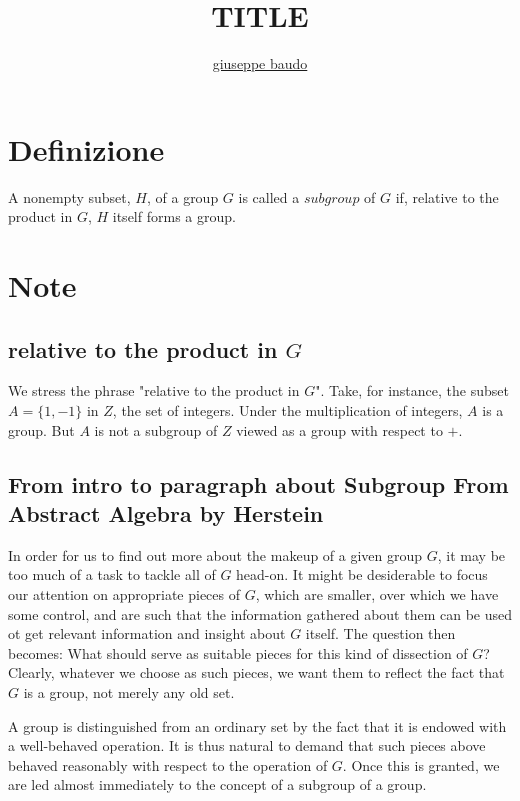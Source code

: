 \documentclass[a4paper,10pt]{article}
\title{TITLE}
\author{\href{http://www.baudo.hol.es}{giuseppe baudo}}
\begin{document}
\maketitle

\section{Definizione}
A nonempty subset, $H$, of a group $G$ is called a $subgroup$ of $G$ if, relative to the product in $G$, $H$ itself forms a group.

\section{Note}
\subsection{relative to the product in $G$}
We stress the phrase "relative to the product in $G$". Take, for instance, the subset $A = \{1, -1\}$ in $Z$, the set of integers. Under the multiplication of integers,
$A$ is a group. But $A$ is not a subgroup of $Z$ viewed as a group with respect to $+$.

\subsection{From intro to paragraph about Subgroup From Abstract Algebra by Herstein}
In order for us to find out more about the makeup of a given group $G$, it may be too much of a task to tackle all of $G$ head-on. It might be desiderable to focus our
attention on appropriate pieces of $G$, which are smaller, over which we have some control, and are such that the information gathered about them can be used ot get 
relevant information and insight about $G$ itself. The question then becomes: What should serve as suitable pieces for this kind of dissection of $G$? Clearly, whatever
we choose as such pieces, we want them to reflect the fact that $G$ is a group, not merely any old set.

A group is distinguished from an ordinary set by the fact that it is endowed with a well-behaved operation. It is thus natural to demand that such pieces above behaved
reasonably with respect to the operation of $G$. Once this is granted, we are led almost immediately to the concept of a subgroup of a group.
\end{document}
